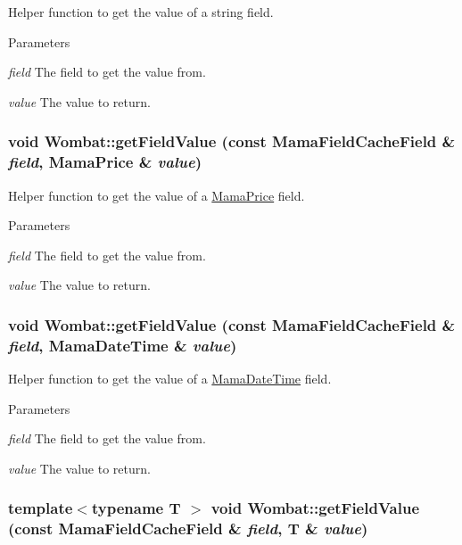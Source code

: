 Helper function to get the value of a string field. 
\begin{DoxyParams}{Parameters}
\item[{\em field}]The field to get the value from. \item[{\em value}]The value to return. \end{DoxyParams}
\hypertarget{namespaceWombat_a021ef9dd6b39c33b35682320f76b7d32}{
\subsubsection[{getFieldValue}]{\setlength{\rightskip}{0pt plus 5cm}void Wombat::getFieldValue (const MamaFieldCacheField \& {\em field}, \/  MamaPrice \& {\em value})}}
\label{namespaceWombat_a021ef9dd6b39c33b35682320f76b7d32}


Helper function to get the value of a \hyperlink{classWombat_1_1MamaPrice}{MamaPrice} field. 
\begin{DoxyParams}{Parameters}
\item[{\em field}]The field to get the value from. \item[{\em value}]The value to return. \end{DoxyParams}
\hypertarget{namespaceWombat_a6031e1467e372e1cc764b8c40376dd20}{
\subsubsection[{getFieldValue}]{\setlength{\rightskip}{0pt plus 5cm}void Wombat::getFieldValue (const MamaFieldCacheField \& {\em field}, \/  MamaDateTime \& {\em value})}}
\label{namespaceWombat_a6031e1467e372e1cc764b8c40376dd20}


Helper function to get the value of a \hyperlink{classWombat_1_1MamaDateTime}{MamaDateTime} field. 
\begin{DoxyParams}{Parameters}
\item[{\em field}]The field to get the value from. \item[{\em value}]The value to return. \end{DoxyParams}
\hypertarget{namespaceWombat_aa23574320542aaec877c264f403fde3a}{
\subsubsection[{getFieldValue}]{\setlength{\rightskip}{0pt plus 5cm}template$<$typename T $>$ void Wombat::getFieldValue (const MamaFieldCacheField \& {\em field}, \/  T \& {\em value})}}
\label{namespaceWombat_aa23574320542aaec877c264f403fde3a}


